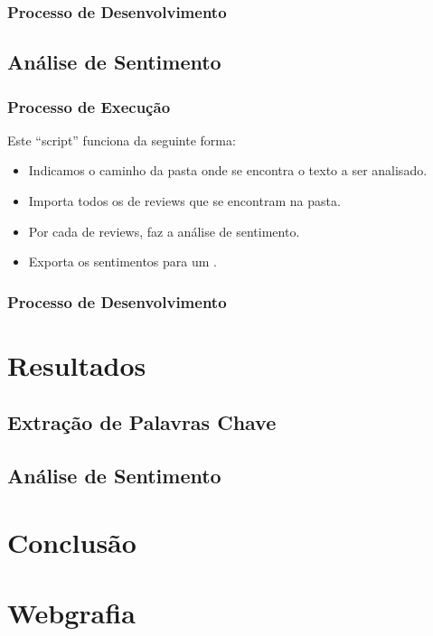 \documentclass[a4paper,10pt]{article}
\begin{document}
\subsubsection{Processo de Desenvolvimento}

\subsection{Análise de Sentimento}

\subsubsection{Processo de Execução}

Este ``script'' funciona da seguinte forma:

\begin{itemize}
  \item Indicamos o caminho da pasta onde se encontra o texto a ser analisado.
  \item Importa todos os  de reviews que se encontram na pasta.
  \item Por cada  de reviews, faz a análise de sentimento.
  \item Exporta os sentimentos para um .
\end{itemize}

\subsubsection{Processo de Desenvolvimento}

\section{Resultados}

\subsection{Extração de Palavras Chave}

\subsection{Análise de Sentimento}

\section{Conclusão}

\section{Webgrafia}

\renewcommand{\bibsection}{}

\end{document}
